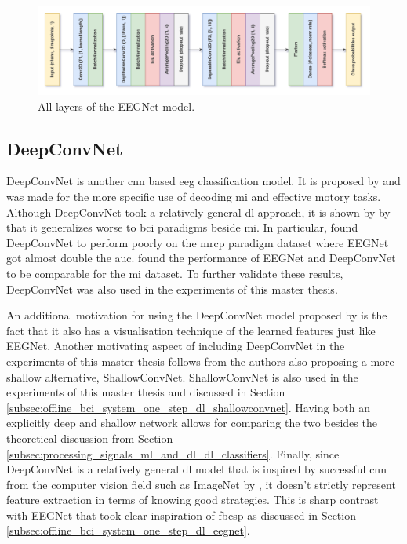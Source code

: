 \begin{figure}[t]
    \centering
    \includegraphics[width=\linewidth]{../images/pipeline/eegnet_full.pdf}
    \captionsetup{width=0.8\linewidth}
    \captionsetup{justification=centering}
    \caption{All layers of the EEGNet model.}
    \label{fig:offline_bci_system_dl_eegnet_full}
\end{figure}


\subsection{DeepConvNet}
\label{subsec:offline_bci_system_one_step_dl_deepconvnet}

DeepConvNet is another \gls{cnn} based \gls{eeg} classification model.
It is proposed by \citet{eeg_model_hbm} and was made for the more specific use of decoding \gls{mi} and effective motory tasks.
Although DeepConvNet took a relatively general \gls{dl} approach, it is shown by by \citet{eeg_model_eegnet} that it generalizes worse to \gls{bci} paradigms beside \gls{mi}.
In particular, \citet{eeg_model_eegnet} found DeepConvNet to perform poorly on the \gls{mrcp} paradigm dataset where EEGNet got almost double the \gls{auc}.
 found the performance of EEGNet and DeepConvNet to be comparable for the \gls{mi} dataset.
To further validate these results, DeepConvNet was also used in the experiments of this master thesis.

An additional motivation for using the DeepConvNet model proposed by \citet{eeg_model_eegnet} is the fact that it also has a visualisation technique of the learned features just like EEGNet.
Another motivating aspect of including DeepConvNet in the experiments of this master thesis follows from the authors also proposing a more shallow alternative, ShallowConvNet.
ShallowConvNet is also used in the experiments of this master thesis and discussed in Section \ref{subsec:offline_bci_system_one_step_dl_shallowconvnet}.
Having both an explicitly deep and shallow network allows for comparing the two besides the theoretical discussion from Section \ref{subsec:processing_signals_ml_and_dl_dl_classifiers}.
Finally, since DeepConvNet is a relatively general \gls{dl} model that is inspired by successful \gls{cnn} from the computer vision field such as ImageNet by \citet{imagenet}, it doesn't strictly represent feature extraction in terms of knowing good strategies.
This is sharp contrast with EEGNet that took clear inspiration of \gls{fbcsp} as discussed in Section \ref{subsec:offline_bci_system_one_step_dl_eegnet}.

